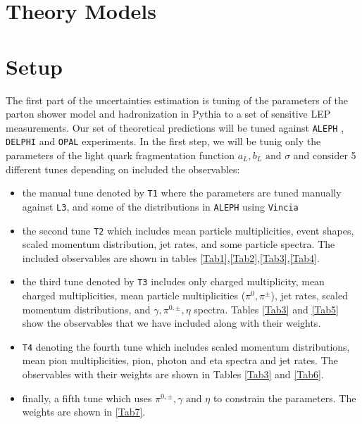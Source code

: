 \documentclass[aps,preprint,floatfix,nofootinbib,showpacs]{revtex4-1}
\begin{document}
\section{Theory Models} %

\section{Setup} %
The first part of the uncertainties estimation is tuning of 
the parameters of the parton shower model and hadronization 
in Pythia to a set of sensitive LEP measurements. Our set
of theoretical predictions will be tuned against
\texttt{ALEPH} \cite{Barate:1996fi, Heister:2001jg, Heister:2001kp},
\texttt{DELPHI} \cite{Abreu:1996na, Abreu:1998nn, DELPHI_2002} and 
\texttt{OPAL} \cite{Akers:1994ez, Ackerstaff:1998ap, Abbiendi:2000cv} experiments.
In the first step, we will be tunig only the parameters of 
the light quark fragmentation function $a_L, b_L \text{ and } \sigma$ 
and consider 5 different tunes depending on included the observables:
\begin{itemize}
\item the manual tune denoted by \texttt{T1} where the parameters
are tuned manually against \texttt{L3}, and some of the distributions in \texttt{ALEPH}
using \texttt{Vincia} \cite{Giele:2007di}
 \item the second tune \texttt{T2} which includes mean particle multiplicities, event shapes, 
 scaled momentum distribution, jet rates, and some particle spectra. The included observables
 are shown in tables \ref{Tab1},\ref{Tab2},\ref{Tab3},\ref{Tab4}.
 \item the third tune denoted by \texttt{T3} includes only charged multiplicity, mean charged multiplicities,
 mean particle multiplicities ($\pi^0, \pi^\pm$), jet rates, scaled momentum distributions, and $\gamma, \pi^{0,\pm}, \eta$
 spectra. Tables \ref{Tab3} and \ref{Tab5} show the observables that we have included along with their 
 weights.
 \item \texttt{T4} denoting the fourth tune which includes scaled momentum distributions, mean pion multiplicities, 
 pion, photon and eta spectra and jet rates. The observables with their weights are shown in Tables \ref{Tab3} and \ref{Tab6}.
 \item finally, a fifth tune which uses $\pi^{0,\pm}, \gamma \text{ and } \eta$ to constrain the parameters. The weights
 are shown in \ref{Tab7}.
\end{itemize}
\end{document}
